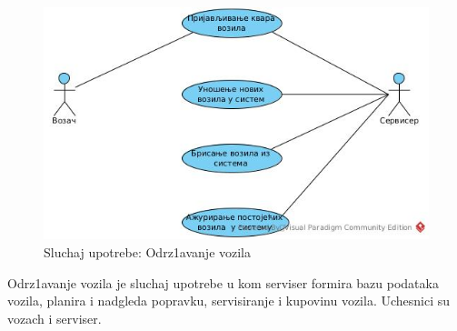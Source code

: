 
\begin{figure}[h!]
    \includegraphics[scale = 0.45]{Slike/SUodrzavanje.jpg}
    \centering
    \caption{Sluchaj upotrebe: Odrz1avanje vozila}
    \label{odrzavanje vozila}
\end{figure}  
Odrz1avanje vozila je sluchaj upotrebe u kom serviser formira bazu podataka vozila, planira i nadgleda popravku, servisiranje i kupovinu vozila. Uchesnici su vozach i serviser. 
